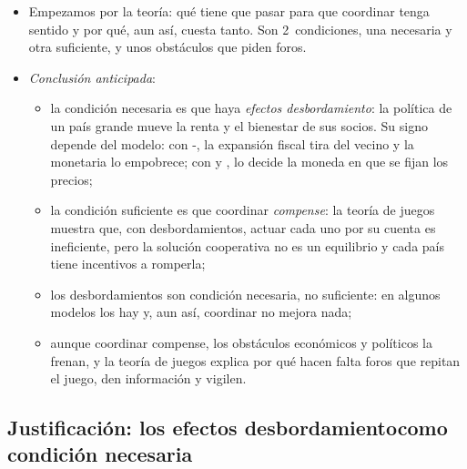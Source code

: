 \documentclass[11pt]{article}
\begin{document}
\begin{itemize}
\item Empezamos por la teoría: qué tiene que pasar para que coordinar tenga sentido y por qué, aun así, cuesta tanto. Son 2~condiciones, una necesaria y otra suficiente, y unos obstáculos que piden foros.
\item \emph{Conclusión anticipada}:
  \begin{itemize}
  \item la condición necesaria es que haya \emph{efectos desbordamiento}: la política de un país grande mueve la renta y el bienestar de sus socios. Su signo depende del modelo: con -, la expansión fiscal tira del vecino y la monetaria lo empobrece; con  y , lo decide la moneda en que se fijan los precios;
  \item la condición suficiente es que coordinar \emph{compense}: la teoría de juegos muestra que, con desbordamientos, actuar cada uno por su cuenta es ineficiente, pero la solución cooperativa no es un equilibrio y cada país tiene incentivos a romperla;
  \item los desbordamientos son condición necesaria, no suficiente: en algunos modelos los hay y, aun así, coordinar no mejora nada;
  \item aunque coordinar compense, los obstáculos económicos y políticos la frenan, y la teoría de juegos explica por qué hacen falta foros que repitan el juego, den información y vigilen.
  \end{itemize}
\end{itemize}

\subsection{Justificación: los efectos desbordamiento\cortetitulo como condición necesaria}\label{sec:desbordamiento}
\end{document}
